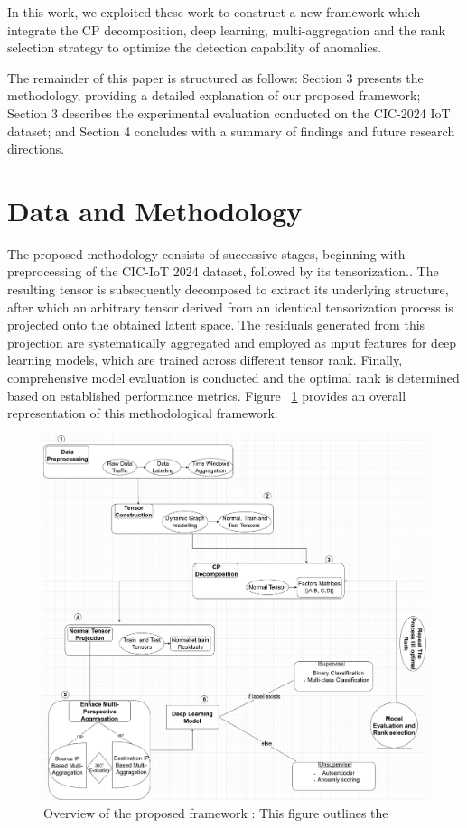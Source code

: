 \documentclass[pdflatex,sn-mathphys-num]{sn-jnl}
\theoremstyle{thmstyleone}
\theoremstyle{thmstyletwo}
\theoremstyle{thmstylethree}
\begin{document}
In this work, we exploited these work to construct a new framework which integrate the CP decomposition, deep learning,  multi-aggregation and the rank selection strategy to optimize the detection capability of anomalies.


The remainder of this paper is structured as follows: Section 3 presents the methodology, providing a detailed explanation of our proposed framework; Section 3 describes the experimental evaluation conducted on the CIC-2024 IoT dataset; and Section 4 concludes with a summary of findings and future research directions.
  

\section{Data and Methodology}
The proposed methodology consists of successive stages, beginning with preprocessing of the CIC-IoT 2024 dataset, followed by its tensorization.. The resulting tensor is subsequently decomposed to extract its underlying structure, after which an arbitrary tensor derived from an identical tensorization process is projected onto the obtained latent space. The residuals generated from this projection are systematically aggregated and employed as input features for deep learning models, which are trained across different tensor rank. Finally, comprehensive model evaluation is conducted and the optimal rank is determined based on established performance metrics. Figure ~\ref{fig:framework}  provides an overall representation of this methodological framework.
\begin{figure}
    \centering   \includegraphics[width=1.18\linewidth]{Framework_Overview.png}
    \caption{Overview of the proposed framework : This figure outlines the }
    \label{fig:framework}
\end{figure}
\end{document}
